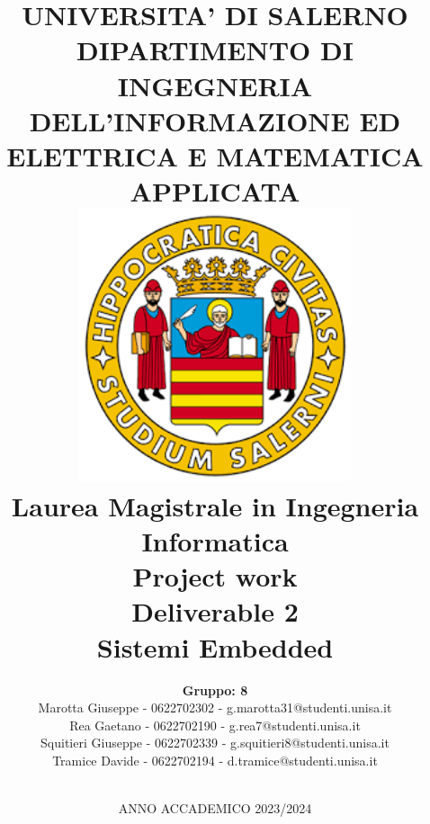 \documentclass[12pt]{article}
\title{
    \Large \textbf{UNIVERSITA' DI SALERNO} \\[0.5em]
    \small DIPARTIMENTO DI INGEGNERIA DELL'INFORMAZIONE ED ELETTRICA E MATEMATICA APPLICATA\\[5em]
    \includegraphics[width=0.6\textwidth]{logo_uni.png}\\[3em] %
    \normalsize Laurea Magistrale in Ingegneria Informatica \\[1em]
    \Large \textbf {Project work} \\[1em]
    \large \textbf {Deliverable 2} \\ [1em]
    \large {Sistemi Embedded} \\[1em]
}
\author{
    \textbf{Gruppo: 8} \\
    \normalsize Marotta Giuseppe - 0622702302 - g.marotta31@studenti.unisa.it\\
    \normalsize Rea Gaetano - 0622702190 - g.rea7@studenti.unisa.it\\
    \normalsize Squitieri Giuseppe - 0622702339 - g.squitieri8@studenti.unisa.it\\ 
    \normalsize Tramice Davide - 0622702194 - d.tramice@studenti.unisa.it\\ \\
    }
\date{
    ANNO ACCADEMICO 2023/2024 %
}
\begin{document}
\begin{titlingpage} %
\maketitle
\thispagestyle{empty} %
\end{titlingpage}

\newpage

\tableofcontents


\newpage
\end{document}
